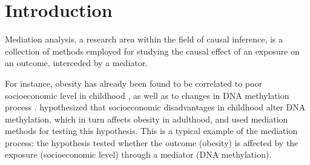 \documentclass[ejs, twoside]{imsart}
\theoremstyle{plain}
\theoremstyle{remark}
\numberwithin{equation}{section}
\numberwithin{table}{section}
\numberwithin{figure}{section}
\begin{document}
\begin{frontmatter}
 \begin{keyword}[class=MSC]
 \end{keyword}

\begin{keyword}
\end{keyword}



\end{frontmatter}


\section{Introduction}



Mediation analysis, a research area within the field of causal inference, is a collection of methods employed for studying the causal effect of an exposure on an outcome, interceded by a mediator.

For instance, obesity has already been found to be correlated to poor socioeconomic level in childhood \citep{senese_associations_2009}, as well as to changes in DNA methylation process \citep{borghol_associations_2012, agha_adiposity_2015}. \citet{huang_genome-wide_2019} hypothesized that socioeconomic disadvantages in childhood alter DNA methylation, which in turn affects obesity in adulthood, and used mediation methods for testing this hypothesis. This is a typical example of the mediation process: the hypothesis tested whether the outcome (obesity) is affected by the exposure (socioeconomic level) through a mediator (DNA methylation).
\end{document}
